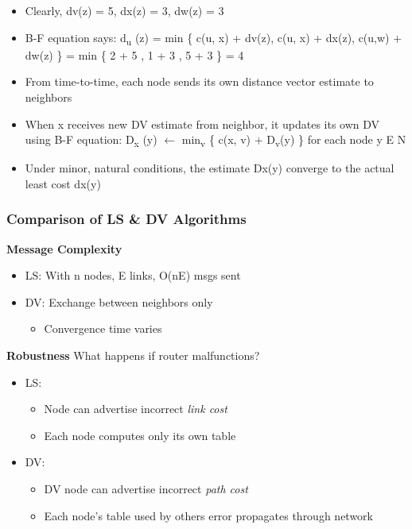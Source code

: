 \documentclass[11pt]{article}
\begin{document}
\begin{itemize}
\item Clearly, dv(z) = 5, dx(z) = 3, dw(z) = 3
\item B-F equation says: d\textsubscript{u} (z) = min \{ c(u, x) + dv(z), c(u, x) + dx(z),
c(u,w) + dw(z) \} = min \{ 2 + 5 , 1 + 3 , 5 + 3 \} = 4
\item From time-to-time, each node sends its own distance vector estimate
to neighbors
\item When x receives new DV estimate from neighbor, it updates its own DV
using B-F equation: D\textsubscript{x} (y) \(\leftarrow\) min\textsubscript{v} \{ c(x, v) + D\textsubscript{v}(y) \}
for each node y E N
\item Under minor, natural conditions, the estimate Dx(y) converge to the
actual least cost dx(y)
\end{itemize}


\subsubsection{Comparison of LS \& DV Algorithms}
\label{sec:org7388c44}

\textbf{Message Complexity}
\begin{itemize}
\item LS: With n nodes, E links, O(nE) msgs sent
\item DV: Exchange between neighbors only 
\begin{itemize}
\item Convergence time varies
\end{itemize}
\end{itemize}

\textbf{Robustness} What happens if router malfunctions?
\begin{itemize}
\item LS: 
\begin{itemize}
\item Node can advertise incorrect \emph{link cost}
\item Each node computes only its own table
\end{itemize}

\item DV:
\begin{itemize}
\item DV node can advertise incorrect \emph{path cost}
\item Each node's table used by others error propagates through network
\end{itemize}
\end{itemize}
\end{document}
